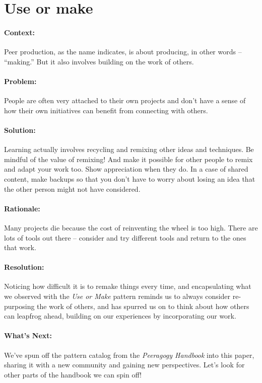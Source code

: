 \section{Use or make}
\paragraph{Context:}
Peer production, as the name indicates, is about producing, in other words --
``making.'' But it also involves building on the work of others.

\paragraph{Problem:}
People are often very attached to their own projects and don't have a sense of how their own initiatives can benefit from connecting with others.

\paragraph{Solution:} Learning actually involves recycling and remixing other ideas and techniques. Be mindful of the value of remixing!  And make it possible for other people to remix and adapt your work too.  Show appreciation when they do.  In a case of shared content, make backups so that you don't have to worry about losing an idea that the other person might not have considered.

\paragraph{Rationale:} 
Many projects die because the cost of reinventing the wheel is too high.  There are lots of tools out there -- consider and try different tools and return to the ones that work.

\paragraph{Resolution:} Noticing how difficult it is to remake things every time, and encapsulating what we observed with the \emph{Use or Make} pattern reminds us to always consider re-purposing the work of others, and has spurred us on to think about how others can leapfrog ahead, building on our experiences by incorporating our work.

\paragraph{What's Next:} We've spun off the pattern catalog from the \emph{Peeragogy Handbook} into this paper, sharing it with a new community and gaining new perspectives.  Let's look for other parts of the handbook we can spin off!

